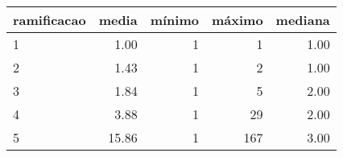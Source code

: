 \begin{table}[ht]
\centering
\begin{tabular}{lrrrr}
  \hline
ramificacao & media & mínimo & máximo & mediana \\ 
  \hline
1 & 1.00 &   1 &   1 & 1.00 \\ 
  2 & 1.43 &   1 &   2 & 1.00 \\ 
  3 & 1.84 &   1 &   5 & 2.00 \\ 
  4 & 3.88 &   1 &  29 & 2.00 \\ 
  5 & 15.86 &   1 & 167 & 3.00 \\ 
   \hline
\end{tabular}
\end{table}
